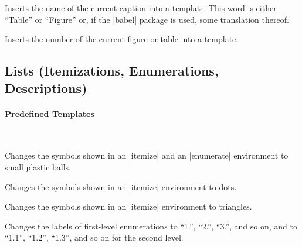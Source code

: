 \begin{command}{\insertcaptionname}
  Inserts the name of the current caption into a template. This word
  is either ``Table'' or ``Figure'' or, if the |babel| package is
  used, some translation thereof.
\end{command}

\begin{command}{\insertcaptionnumber}
  Inserts the number of the current figure or table into a template.
\end{command}






\subsection{Lists (Itemizations, Enumerations, Descriptions)}

\label{section-template-enumerate}

\paragraph{Predefined Templates}\

\begin{command}{\beamertemplateballitem}
  Changes the symbols shown in an |itemize| and an |enumerate|
  environment to small plastic balls.
\end{command}

\begin{command}{\beamertemplatedotitem}
  Changes the symbols shown in an |itemize|
  environment to dots.
\end{command}

\begin{command}{\beamertemplatetriangleitem}
  Changes the symbols shown in an |itemize|
  environment to triangles.
\end{command}

\begin{command}{\beamertemplateenumeratealpha}
  Changes the labels of first-level enumerations to ``1.'', ``2.'',
  ``3.'', and so on, and to ``1.1'', ``1.2'', ``1.3'', and so on for
  the second level.
\end{command}




